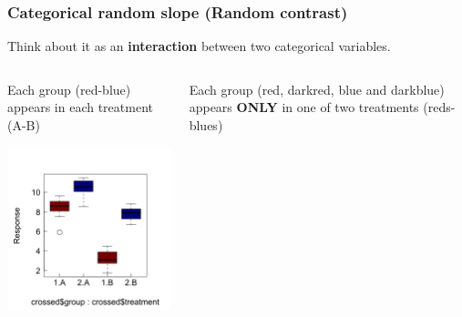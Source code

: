 \documentclass{beamer}
\begin{document}
\begin{frame}
\frametitle{Categorical random slope (Random contrast)}

Think about it as an \textbf{interaction} between two categorical variables.
\vspace{0.3cm}

    \begin{columns}
        \begin{column}{0.5\textwidth}
            Each group (red-blue) appears in each treatment (A-B)
                        
            \includegraphics[width=\textwidth]{lectures/day_5_theory_of_mems/figures/unnamed-chunk-12-1.png}
        \end{column}
        \begin{column}{0.5\textwidth}
            Each group (red, darkred, blue and darkblue) appears \textbf{ONLY} in one of two treatments (reds-blues)

\end{column}
\end{columns}
\end{frame}
\end{document}
